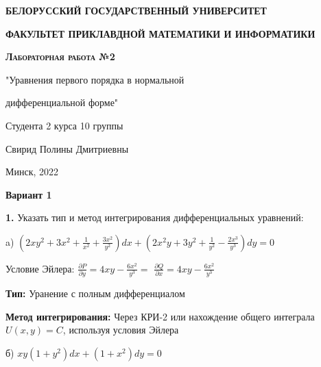 \documentclass[a4paper]{article}
\begin{document}
\begin{titlepage}
  \begin{center}
    \large
    \vspace{0.5cm}
    \textbf{БЕЛОРУССКИЙ ГОСУДАРСТВЕННЫЙ УНИВЕРСИТЕТ}
    
    \textbf{ФАКУЛЬТЕТ ПРИКЛАВДНОЙ МАТЕМАТИКИ И ИНФОРМАТИКИ}
    \vspace{0.5cm}
     
    
    \vfill
     
     
    \textbf{\textsc{Лабораторная работа №2}}
    
    "Уравнения первого порядка в нормальной 
    
    дифференциальной форме"
    \vfill

    Студента 2 курса 10 группы
    
    Свирид Полины Дмитриевны
    \vspace{3cm}
     
     
\end{center}
\vfill
 
\begin{center}
  Минск, 2022
\end{center}
\end{titlepage}

\begin{center}
  \textbf{Вариант 1}
\end{center}

\textbf{1.} Указать тип и метод интегрирования дифференциальных уравнений:

\vspace{1cm}

a) $\displaystyle (2xy^2+3x^2+\frac{1}{x^2} + \frac{3x^2}{y^2})dx + (2x^2y + 3y^2 + \frac{1}{y^2} - \frac{2x^3}{y^3})dy = 0$

\vspace{0.3cm}

Условие Эйлера: $\displaystyle \frac{\partial P}{\partial y} = 4xy-\frac{6x^2}{y^3}  =$ $\displaystyle \frac{\partial Q}{\partial x} = 4xy-\frac{6x^2}{y^3}$

\vspace{0.3cm}

\textbf{Тип: } Уранение с полным дифференциалом

\textbf{Метод интегрирования: } Через КРИ-2 или нахождение общего интеграла $U(x, y) = C$, используя условия Эйлера

\vspace{1cm}

б) $\displaystyle xy(1+y^2)dx + (1+x^2)dy = 0$
\end{document}
